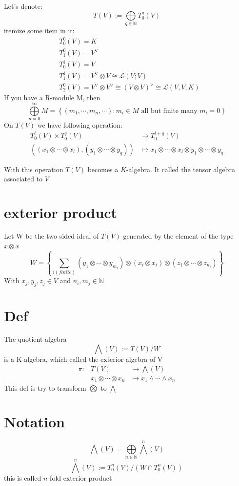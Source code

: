 \documentclass{book}
\begin{document}
Let's denote:
$$T(V):=\bigoplus\limits_{q\in \mathbb{N}} T_0^q(V)$$
itemize some item in it:
$$\begin{aligned}
    &T_0^0(V)=K\\
    &T_1^0(V)=V^\vee\\
    &T_0^1(V)=V\\
    &T_1^1(V)=V^\vee\otimes V\cong\mathscr{L}(V;V)\\
    &T_2^0(V)=V^\vee\otimes V^\vee\cong (V\otimes V)^\vee\cong\mathscr{L}(V,V;K)
\end{aligned}$$
If you have a R-module M, then 
$$\bigoplus\limits_{n=0}^\infty M=\left\{(m_1,\cdots,m_n,\cdots):m_i\in M \text{ all but finite many }m_i=0\right\}$$
On $T(V)$ we have following operation:
$$
\begin{aligned}
    T_0^l(V)\times T_0^q(V)&\rightarrow T_0^{l+q}(V)\\
    ((x_1\otimes\cdots\otimes x_l),(y_1\otimes\cdots\otimes y_q))&\mapsto  x_1\otimes\cdots\otimes x_l\otimes y_1\otimes\cdots\otimes y_q
\end{aligned}
$$

With this operation $T(V)$ becomes a $K$-algebra. It called the tensor algebra associated to $V$
\section{exterior product}
Let W be the two sided ideal of $T(V)$ generated by the element of the type $x\otimes x$
$$W=\left\{\sum\limits_{i(finite)}(y_1\otimes\cdots\otimes y_{m_i})\otimes(x_i\otimes x_i)\otimes(z_1\otimes\cdots\otimes z_{n_i})\right\} $$
With $x_j,y_j,z_j\in V$ and $n_i,m_j\in \mathbb{N}$
\section{Def}
The quotient algebra $$\bigwedge(V):=T(V)/W$$
is a K-algebra, which called the exterior algebra of V
$$
\begin{aligned}
    \pi: &T(V) &\rightarrow \bigwedge(V)\\
    &x_1\otimes\cdots\otimes x_n &\mapsto x_1\wedge\cdots\wedge x_n
\end{aligned}$$
This def is try to transform $\bigotimes$ to $\bigwedge$
\section{Notation}
$$\bigwedge(V)=\bigoplus \limits_{n\in\mathbb{N}} \bigwedge^n(V)$$
$$\bigwedge^n(V):=T^n_0(V)/\left(W\cap T_0^n(V)\right)$$
this is called $n$-fold exterior product
\end{document}
